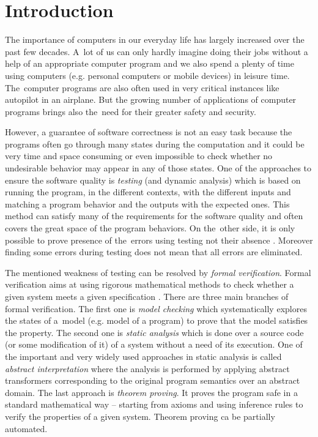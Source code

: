 \chapter{Introduction}

The importance of computers in our everyday life has largely increased over the past few decades.
A~lot of us can only hardly imagine doing their jobs without a help of an appropriate computer program
and we also spend a plenty of time using computers (e.g. personal computers or mobile devices) in leisure time.
The~computer programs are also often used in very critical instances like autopilot in an airplane.
But the growing number of applications of computer programs brings also the~need for their greater safety and security.

However, a guarantee of software correctness is not an easy task
because the programs often go through many states during the computation
and it could be very time and space consuming or even impossible to check whether no undesirable behavior
may appear in any of those states.
One of the approaches to ensure the software quality is \emph{testing} (and dynamic analysis) which is based
on running the program, in the different contexts, with the different inputs
and matching a program behavior and the outputs with the expected ones.
This method can satisfy many of the requirements for the software quality and often covers the great space of the program behaviors.
On the~other side, it is only possible to prove presence of the~errors using testing not their absence \cite{dijkstra}.
Moreover finding some errors during testing does not mean that all errors are eliminated.

The mentioned weakness of testing can be resolved by \emph{formal verification}.
Formal verification aims at using rigorous mathematical methods to check whether a given system meets a given specification \cite{fav:lecture}.
There are three main branches of formal verification.
The first one is \emph{model checking} which systematically explores the states of a~model (e.g. model of a program) to
prove that the model satisfies the property.
The second one is \emph{static analysis} which is done over a source code (or some modification of it) of a system
without a need of its execution.
One of the important and very widely used approaches in static analysis is called \emph{abstract interpretation} where the analysis is performed by
applying abstract transformers corresponding to the original program semantics over an abstract domain.
The last approach is \emph{theorem proving}.
It proves the program safe in a standard mathematical way -- starting from axioms and using inference rules to
verify the properties of a given system.
Theorem proving ca be partially automated.

